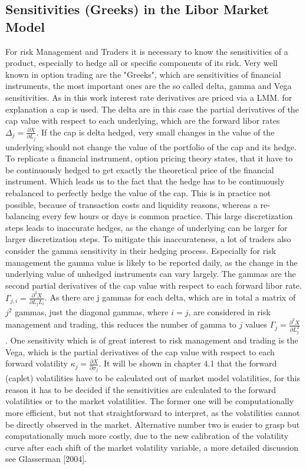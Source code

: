\documentclass[11pt]{article}
\numberwithin{equation}{subsection}
\begin{document}
\subsection{Sensitivities (Greeks) in the Libor Market Model}
For risk Management and Traders it is necessary to know the sensitivities of a product, especially to hedge all or specific components of its risk. Very well known in option trading are the "Greeks", which are sensitivities of financial instruments, the most important ones are the so called delta, gamma and Vega sensitivities. As in this work interest rate derivatives are priced via a LMM. for explanation a cap is used. The delta are in this case the partial derivatives of the cap value with respect to each underlying, which are the forward libor rates  \(\Delta_j = \frac{\partial X}{\partial L_j}\). If the cap is delta hedged, very small changes in the value of the underlying should not change the value of the portfolio of the cap and its hedge. To replicate a financial instrument, option pricing theory states, that it have to be continuously hedged to get exactly the theoretical price of the financial instrument. Which leads us to the fact that the hedge has to be continuously rebalanced to perfectly hedge the value of the cap. This is in practice not possible, because of transaction costs and liquidity reasons, whereas a re-balancing every few hours or days is common practice. This large discretization steps leads to inaccurate hedges, as the change of underlying can be larger for larger discretization steps. To mitigate this inaccurateness, a lot of traders also consider the gamma sensitivity in their hedging process. Especially for risk management the gamma value is likely to be reported daily, as the change in the underlying value of unhedged instruments can vary largely. The gammas are the second partial derivatives of the cap value with respect to each forward libor rate. \(\Gamma_{j,i}=\frac{\partial^2 X}{\partial L_j L_i}\). As there are j gammas for each delta, which are in total a matrix of \(j^2\) gammas, just the diagonal gammas, where \(i=j\), are considered in risk management and trading, this reduces the number of gamma to \(j\) values \(\Gamma_{j}=\frac{\partial^2 X}{\partial L_j^2}\). One sensitivity which is of great interest to risk management and trading is the Vega, which is the partial derivatives of the cap value with respect to each forward volatility \(\kappa_j=\frac{\partial X}{\partial \sigma_{j}}\). It will be shown in chapter 4.1 that the forward (caplet) volatilities have to be calculated out of market model volatilities, for this reason it has to be decided if the sensitivities are calculated to the forward volatilities or to the market volatilities. The former one will be computationally more efficient, but not that straightforward to interpret, as the volatilities cannot be directly observed in the market. Alternative number two is easier to grasp but computationally much more costly, due to the new calibration of the volatility curve after each shift of the market volatility variable, a more detailed discussion see Glasserman [2004].\\
\end{document}
